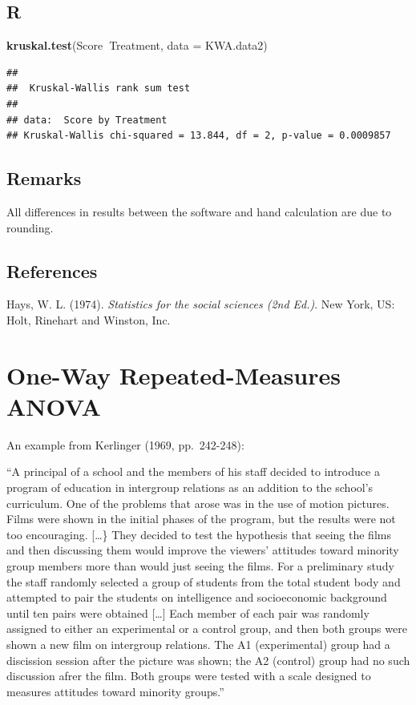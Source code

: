 \documentclass[
]{book}
\newenvironment{Shaded}{\begin{snugshade}}{\end{snugshade}}
\newcommand{\DataTypeTok}[1]{\textcolor[rgb]{0.13,0.29,0.53}{#1}}
\newcommand{\KeywordTok}[1]{\textcolor[rgb]{0.13,0.29,0.53}{\textbf{#1}}}
\newcommand{\NormalTok}[1]{#1}
\newcommand{\OperatorTok}[1]{\textcolor[rgb]{0.81,0.36,0.00}{\textbf{#1}}}
\begin{document}
\hypertarget{r-2}{%
\subsection{R}\label{r-2}}

\begin{Shaded}
\begin{Highlighting}[]
\KeywordTok{kruskal.test}\NormalTok{(Score}\OperatorTok{~}\NormalTok{Treatment, }\DataTypeTok{data =}\NormalTok{ KWA.data2)}
\end{Highlighting}
\end{Shaded}

\begin{verbatim}
## 
## 	Kruskal-Wallis rank sum test
## 
## data:  Score by Treatment
## Kruskal-Wallis chi-squared = 13.844, df = 2, p-value = 0.0009857
\end{verbatim}

\hypertarget{remarks-2}{%
\subsection{Remarks}\label{remarks-2}}

All differences in results between the software and hand calculation are due to rounding.

\hypertarget{references-2}{%
\subsection{References}\label{references-2}}

Hays, W. L. (1974). \emph{Statistics for the social sciences (2nd Ed.)}. New York, US: Holt, Rinehart and Winston, Inc.

\hypertarget{one-way-repeated-measures-anova}{%
\section{One-Way Repeated-Measures ANOVA}\label{one-way-repeated-measures-anova}}

An example from Kerlinger (1969, pp.~242-248):

``A principal of a school and the members of his staff decided to introduce a program of education in intergroup relations as an addition to the school's curriculum. One of the problems that arose was in the use of motion pictures. Films were shown in the initial phases of the program, but the results were not too encouraging. {[}\ldots\} They decided to test the hypothesis that seeing the films and then discussing them would improve the viewers' attitudes toward minority group members more than would just seeing the films. For a preliminary study the staff randomly selected a group of students from the total student body and attempted to pair the students on intelligence and socioeconomic background until ten pairs were obtained {[}\ldots{]} Each member of each pair was randomly assigned to either an experimental or a control group, and then both groups were shown a new film on intergroup relations. The A1 (experimental) group had a discission session after the picture was shown; the A2 (control) group had no such discussion afrer the film. Both groups were tested with a scale designed to measures attitudes toward minority groups.''
\end{document}
